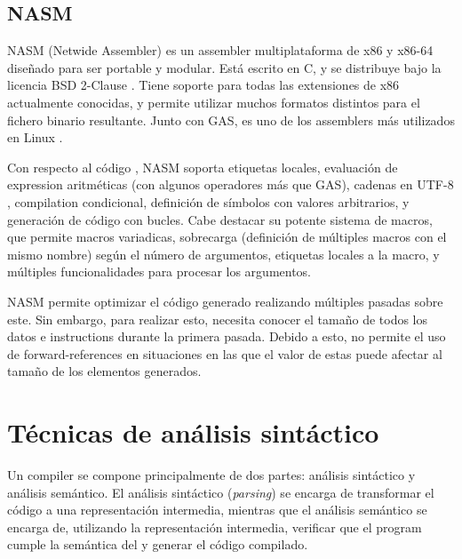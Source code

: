\subsection{NASM}

NASM (Netwide Assembler) \parencite{NASM} es un \gls{assembler} multiplataforma
de x86 y x86-64 diseñado para ser portable y modular. Está escrito en C, y se
distribuye bajo la licencia BSD 2-Clause \parencite{bsd-2c}. Tiene soporte para
todas las extensiones de x86 actualmente conocidas, y permite utilizar muchos
formatos distintos para el fichero binario resultante. Junto con \gls{GAS}, es
uno de los \glspl{assembler} más utilizados en Linux
\parencite{assembler-usage}.

Con respecto al código , NASM soporta etiquetas
locales, evaluación de \gls{expression} aritméticas (con algunos operadores más
que \gls{GAS}), cadenas en UTF-8 \parencite{UTF-8}, \gls{compilation}
condicional, definición de símbolos con valores arbitrarios, y generación de
código con bucles. Cabe destacar su potente sistema de \glspl{macro}, que
permite \glspl{macro} variadicas, sobrecarga (definición de múltiples
\glspl{macro} con el mismo nombre) según el número de argumentos, etiquetas
locales a la \gls{macro}, y múltiples funcionalidades para procesar los
argumentos.

NASM permite optimizar el código generado realizando múltiples pasadas sobre
este. Sin embargo, para realizar esto, necesita conocer el tamaño de todos los
datos e \glspl{instruction} durante la primera pasada. Debido a esto, no permite
el uso de \glspl{forward-reference} en situaciones en las que el valor de estas
puede afectar al tamaño de los elementos generados. \parencite{NASM-manual}


\section{Técnicas de análisis sintáctico}\label{sec:parser-techniques}

Un \gls{compiler} se compone principalmente de dos partes: análisis sintáctico y
análisis semántico. El análisis sintáctico (\textit{parsing}) se encarga de
transformar el código a una representación intermedia, mientras que el análisis
semántico se encarga de, utilizando la representación intermedia, verificar que
el \gls{program} cumple la semántica del 
y generar el código compilado. \parencite{dragon-book}

